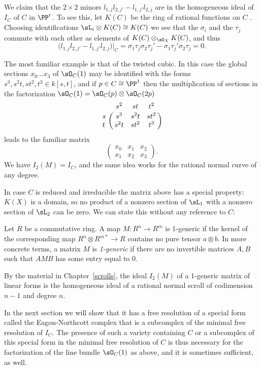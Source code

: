 We claim that  the $2\times 2$ minors $l_{1,j} l_{2,j'}-l_{1,j'}l_{2,j}$ are in the homogeneous ideal of $I_C$ of $C$ in $\PP^r$. 
To see this,
let $K(C)$ be the ring of rational functions on $C$ . Choosing identifications $\sL_i\otimes K(C) \cong K(C)$ we see that the $\sigma_i$ and the $\tau_j$ commute with each other as elements of $K(C) \otimes_{\sO_X} K(C)$, and thus 
$$
\bigl(l_{1,j} l_{2,j'}-l_{1,j'}l_{2,j}\bigr)|_C = \sigma_1\tau_j\sigma_2\tau_j' - \sigma_1\tau_j'\sigma_2\tau_j =0.
$$

\begin{example}
The most familiar example is that of the twisted cubic. In this case the global sections $x_0\dots x_3$ of $\sO_C(1)$ may be identified with the forms $s^3, s^2t, st^2, t^3 \in k[s,t]$, and if $p\in C \cong \PP^1$ then the multiplication of sections
in the factorization  $\sO_C(1) = \sO_C(p) \otimes \sO_C(2p)$ 
$$
\bordermatrix{
 &s^2&st&t^2\cr
 s& s^3&s^2t&st^2\cr
 t& s^2t&st^2&t^3
}
$$
 leads to the familiar matrix
$$
\begin{pmatrix}
x_0&x_1&x_2\\
x_1&x_2&x_3 
\end{pmatrix}.
$$
We have $I_2(M) = I_C$, and the same idea works for the rational normal curve of any degree.
\end{example}

In case $C$ is reduced and irreducible the matrix above has a special property: $K(X)$ is a domain, so no product of a nonzero
section of $\sL_1$ with a nonzero section of $\sL_2$ can be zero. We can state this without any reference to $C$:

\begin{definition}
Let $R$ be a commutative ring. A map $M:R^n\to R^m$ is 1-generic if the kernel of the corresponding
 map $R^{n}\otimes R^{m*} \to R$  contains no pure tensor $a\otimes b$. In more concrete terms, a matrix
$M$ is \emph{1-generic} if there are no invertible matrices $A,B$ such that  $AMB$ has some entry equal to 0.
\end{definition}

By the material in Chapter~\ref{scrolls}, the ideal $I_2(M)$ of a 1-generic matrix of linear forms is the homogeneous ideal of a rational normal 
scroll
of codimension $n-1$ and degree $n$. 

In the next section we will show that it has a free resolution of a special form called the 
Eagon-Northcott complex that is a subcomplex of the minimal free resolution of $I_C$. The presence of such a variety containing $C$ or
a subcomplex of this special form in the minimal free resolution of $C$ is thus necessary for the 
factorization of the line bundle $\sO_C(1)$ as above, and it is sometimes sufficient, as well.

